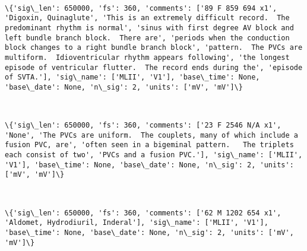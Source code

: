 \documentclass[11pt]{article}
\begin{document}
    \begin{center}
    \end{center}
    { \hspace*{\fill} \\}
    
    \begin{Verbatim}[commandchars=\\\{\}]
\{'sig\_len': 650000, 'fs': 360, 'comments': ['89 F 859 694 x1', 'Digoxin, Quinaglute', 'This is an extremely difficult record.  The predominant rhythm is normal', 'sinus with first degree AV block and left bundle branch block.  There are', 'periods when the conduction block changes to a right bundle branch block', 'pattern.  The PVCs are multiform.  Idioventricular rhythm appears following', 'the longest episode of ventricular flutter.  The record ends during the', 'episode of SVTA.'], 'sig\_name': ['MLII', 'V1'], 'base\_time': None, 'base\_date': None, 'n\_sig': 2, 'units': ['mV', 'mV']\}

    \end{Verbatim}

    \begin{center}
    \end{center}
    { \hspace*{\fill} \\}
    
    \begin{Verbatim}[commandchars=\\\{\}]
\{'sig\_len': 650000, 'fs': 360, 'comments': ['23 F 2546 N/A x1', 'None', 'The PVCs are uniform.  The couplets, many of which include a fusion PVC, are', 'often seen in a bigeminal pattern.   The triplets each consist of two', 'PVCs and a fusion PVC.'], 'sig\_name': ['MLII', 'V1'], 'base\_time': None, 'base\_date': None, 'n\_sig': 2, 'units': ['mV', 'mV']\}

    \end{Verbatim}

    \begin{center}
    \end{center}
    { \hspace*{\fill} \\}
    
    \begin{Verbatim}[commandchars=\\\{\}]
\{'sig\_len': 650000, 'fs': 360, 'comments': ['62 M 1202 654 x1', 'Aldomet, Hydrodiuril, Inderal'], 'sig\_name': ['MLII', 'V1'], 'base\_time': None, 'base\_date': None, 'n\_sig': 2, 'units': ['mV', 'mV']\}

    \end{Verbatim}
\end{document}
